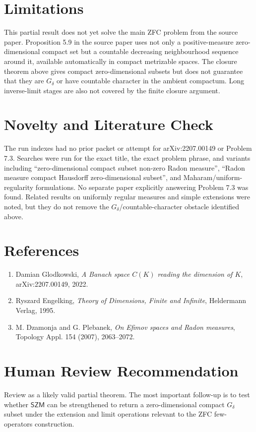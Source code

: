 \documentclass[11pt]{article}
\begin{document}
\section*{Limitations}

This partial result does not yet solve the main ZFC problem from the source paper.  Proposition 5.9 in the source paper uses not only a positive-measure zero-dimensional compact set but a countable decreasing neighbourhood sequence around it, available automatically in compact metrizable spaces.  The closure theorem above gives compact zero-dimensional subsets but does not guarantee that they are \(G_\delta\) or have countable character in the ambient compactum.  Long inverse-limit stages are also not covered by the finite closure argument.

\section*{Novelty and Literature Check}

The run indexes had no prior packet or attempt for arXiv:2207.00149 or Problem 7.3.  Searches were run for the exact title, the exact problem phrase, and variants including ``zero-dimensional compact subset non-zero Radon measure'', ``Radon measure compact Hausdorff zero-dimensional subset'', and Maharam/uniform-regularity formulations.  No separate paper explicitly answering Problem 7.3 was found.  Related results on uniformly regular measures and simple extensions were noted, but they do not remove the \(G_\delta\)/countable-character obstacle identified above.

\section*{References}

\begin{enumerate}
\item Damian Glodkowski, \emph{A Banach space \(C(K)\) reading the dimension of \(K\)}, arXiv:2207.00149, 2022.
\item Ryszard Engelking, \emph{Theory of Dimensions, Finite and Infinite}, Heldermann Verlag, 1995.
\item M. Dzamonja and G. Plebanek, \emph{On Efimov spaces and Radon measures}, Topology Appl. 154 (2007), 2063--2072.
\end{enumerate}

\section*{Human Review Recommendation}

Review as a likely valid partial theorem.  The most important follow-up is to test whether \(\mathsf{SZM}\) can be strengthened to return a zero-dimensional compact \(G_\delta\) subset under the extension and limit operations relevant to the ZFC few-operators construction.
\end{document}
